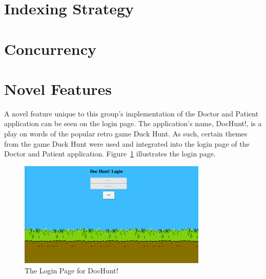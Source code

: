 \documentclass{article}
\begin{document}
\section{Indexing Strategy}


\section{Concurrency}

\section{Novel Features}
A novel feature unique to this group's implementation of the Doctor and Patient application can be seen on the login page. The application's name, DocHunt!, is a play on words of the popular retro game Duck Hunt. As such, certain themes from the game Duck Hunt were used and integrated into the login page of the Doctor and Patient application. Figure~\ref{fig:docHuntLogin} illustrates the login page.
\begin{figure}[H]
	\centering
	\includegraphics[width=0.8\textwidth]{"res/image/DocHunt Login Page"}
	\caption{The Login Page for DocHunt!}
	\label{fig:docHuntLogin}
\end{figure}
\end{document}
